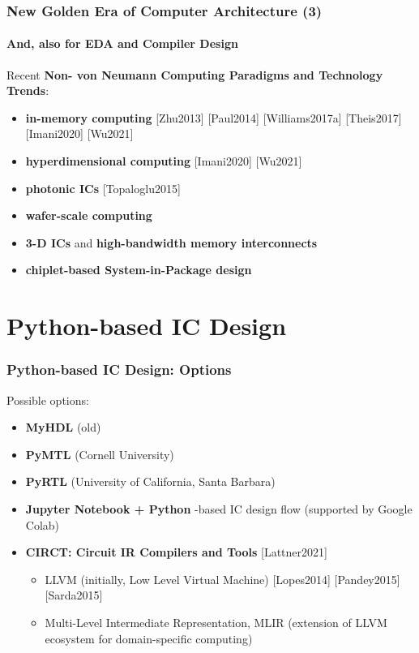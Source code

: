 \documentclass[xcolor={usenames,dvipsnames},hyperref={hyperindex,bookmarks}]{beamer}
\begin{document}
\begin{frame}
	\frametitle{New Golden Era of Computer Architecture (3)}
	\framesubtitle{And, also for EDA and Compiler Design}
	
	Recent {\bf Non- von Neumann Computing Paradigms and Technology Trends}:
	\begin{itemize}
	\item {\bf in-memory computing} [Zhu2013] [Paul2014] [Williams2017a] [Theis2017] [Imani2020] [Wu2021]
	\item {\bf hyperdimensional computing} [Imani2020] [Wu2021]
	\item {\bf photonic ICs} [Topaloglu2015]
	\item {\bf wafer-scale computing}
	\item {\bf 3-D ICs} and {\bf high-bandwidth memory interconnects}
	\item {\bf chiplet-based System-in-Package design}
	\end{itemize}

\end{frame}






\section{Python-based IC Design}

\begin{frame}
	\frametitle{Python-based IC Design: Options}
	
	Possible options:
	\begin{itemize}
	\item {\bf MyHDL} (old)
	\item {\bf PyMTL} (Cornell University)
	\item {\bf PyRTL} (University of California, Santa Barbara)
	\item {\bf Jupyter Notebook + Python} -based IC design flow (supported by Google Colab)
	\item {\bf CIRCT: Circuit {IR} Compilers and Tools} [Lattner2021]
		\begin{itemize}
		\item LLVM (initially, Low Level Virtual Machine) [Lopes2014] [Pandey2015] [Sarda2015]
		\item Multi-Level Intermediate Representation, MLIR (extension of LLVM ecosystem for domain-specific computing)
		\end{itemize}
	\end{itemize}

\end{frame}
\end{document}
